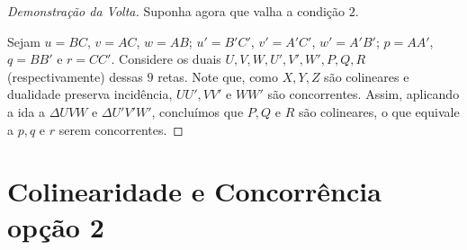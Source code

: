 \begin{comment}
\begin{proof}[Demonstração da Volta]
Agora para mostrar a volta vamos usar outro argumento.

Tome vamos chamar $BC$ de $a$, $AC$ de $b$ e $AB$ de $c$ e o análogo para $A'B'$,$A'C'$ e $B'C'$, vamos chamar $AA'$ de $x$, $BB'$ de $y$ e $CC'$ de $z$, por último vamos chamar $XY$ de $o$.

Note que a ida era, dados $ABC$ e $A'B'C'$, temos que se $AA'$, $BB'$ e $CC'$ concorrem então $AB \cap A'B'$, $AC\cap A'C'$ e $ BC \cap B'C'$ são colineares. Já a volta é temos, dados $abc$ e $a'b'c'$, se $a \cap a'$, $b \cap b'$ e $c\cap c'$ são colineares então as retas $a\cap b \ a'\cap b'$, $a\cap c \ a' \cap c'$ e $ b\cap c \ b'\cap c'$ são concorrentes.

Ou seja, a volta do problema é exatamente a ida "trocando" ponto por reta, e algo curioso do plano projetivo é que uma igualdade do tipo $ax+by+cz=0$ pode ser interpretada como, o ponto $[x,y,z]$ pertence a reta $<a,b,c>$ ou como o ponto $[a,b,c]$ pertence a reta $\langle x,y,z\rangle$, com isso para resolver a volta a gente vai fazer o seguinte truque:

Escolha uma base qualquer para $\RR^3$, imagine para cada reta que você calcular as coordenadas nos pontos com os mesmos números como coordenadas, no mundo dos pontos nos já sabemos que a conta fecha, e como a conta é exatamente a mesma para um mundo com retas e um mundo com pontos, temos que no munda das retas a conta também fecha, ou seja a volta é uma consequência direta da ida.
\end{proof}
\end{comment}

\begin{proof}[Demonstração da Volta]
Suponha agora que valha a condição $2$.

Sejam \(u = BC\), \(v = AC\), \(w = AB\); \(u' = B'C'\), \(v' = A'C'\), \(w' = A'B'\); \(p = AA'\), \(q = BB'\) e \(r = CC'\). Considere os duais $U,V,W,U',V',W',P,Q,R$ (respectivamente) dessas $9$ retas. Note que, como $X,Y,Z$ são colineares e dualidade preserva incidência, $UU', VV'$ e $WW'$ são concorrentes. Assim, aplicando a ida a $\Delta UVW$ e $\Delta U'V'W'$, concluímos que $P,Q$ e $R$ são colineares, o que equivale a $p,q$ e $r$ serem concorrentes.
\end{proof}


\section{Colinearidade e Concorrência opção 2}

